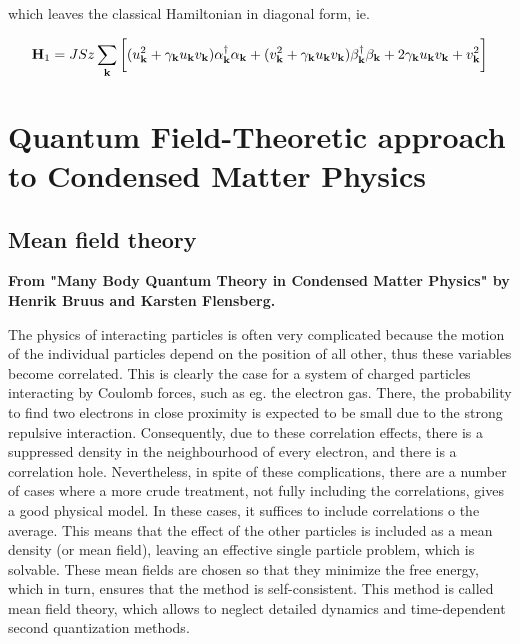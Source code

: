 \documentclass{homework}
\begin{document}
which leaves the classical Hamiltonian in diagonal form, ie.

\begin{equation}
    {\bf H}_1 = JSz \sum_{{\bf k}} \bigg[ (u^2_{{\bf k}} + \gamma_{{\bf k}} u_{{\bf k}} v_{{\bf k}} )\alpha^\dagger_{{\bf k}} \alpha_{{\bf k}} + (v_{{\bf k}}^2 + \gamma_{{\bf k}} u_{{\bf k}} v_{{\bf k}})\beta^\dagger_{{\bf k}} \beta_{{\bf k}} + 2 \gamma_{{\bf k}} u_{{\bf k}} v_{{\bf k}} + v^2_{{\bf k}} \bigg]
\end{equation}

\clearpage

\section{\textbf{Quantum Field-Theoretic approach to Condensed Matter Physics}}

\subsection{Mean field theory}

\textbf{From "Many Body Quantum Theory in Condensed Matter Physics" by Henrik Bruus and Karsten Flensberg.}

\begin{tcolorbox}[colback = yellow, title = Physical Context]

The physics of interacting particles is often very complicated because the motion of the individual particles depend on the position of all other, thus these variables become correlated. This is clearly the case for a system of charged particles interacting by Coulomb forces, such as eg. the electron gas. There, the probability to find two electrons in close proximity is expected to be small due to the strong repulsive interaction. Consequently, due to these correlation effects, there is a suppressed density in the neighbourhood of every electron, and there is a correlation hole. 
Nevertheless, in spite of these complications, there are a number of cases where a more crude treatment, not fully including the correlations, gives a good physical model. In these cases, it suffices to include correlations o the average. This means that the effect of the other particles is included as a mean density (or mean field), leaving an effective single particle problem, which is solvable. These mean fields are chosen so that they minimize the free energy, which in turn, ensures that the method is self-consistent. This method is called mean field theory, which allows to neglect detailed dynamics and time-dependent second quantization methods. 

\end{tcolorbox}
\end{document}
